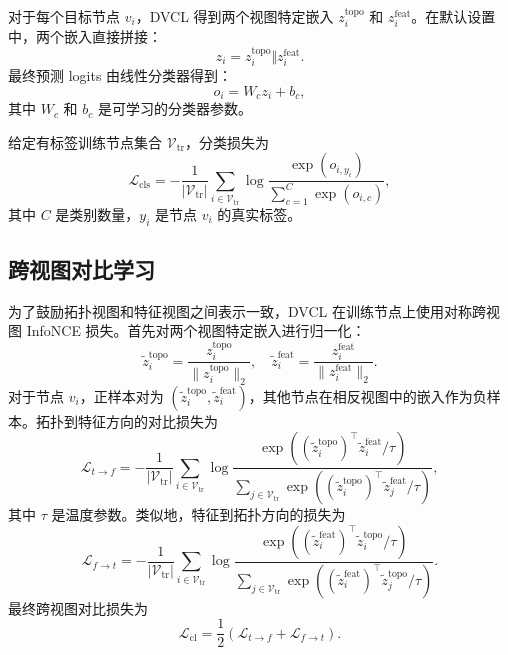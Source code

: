 对于每个目标节点 $v_i$，DVCL 得到两个视图特定嵌入 $z_i^{\mathrm{topo}}$ 和 $z_i^{\mathrm{feat}}$。在默认设置中，两个嵌入直接拼接：
\begin{equation}
z_i
=
z_i^{\mathrm{topo}}
\Vert
z_i^{\mathrm{feat}}.
\end{equation}
最终预测 logits 由线性分类器得到：
\begin{equation}
o_i
=
W_c z_i + b_c,
\end{equation}
其中 $W_c$ 和 $b_c$ 是可学习的分类器参数。

给定有标签训练节点集合 $\mathcal{V}_{\mathrm{tr}}$，分类损失为
\begin{equation}
\mathcal{L}_{\mathrm{cls}}
=
-\frac{1}{|\mathcal{V}_{\mathrm{tr}}|}
\sum_{i\in\mathcal{V}_{\mathrm{tr}}}
\log
\frac{\exp(o_{i,y_i})}
{\sum_{c=1}^{C}\exp(o_{i,c})},
\end{equation}
其中 $C$ 是类别数量，$y_i$ 是节点 $v_i$ 的真实标签。

\subsection{跨视图对比学习}

为了鼓励拓扑视图和特征视图之间表示一致，DVCL 在训练节点上使用对称跨视图 InfoNCE 损失。首先对两个视图特定嵌入进行归一化：
\begin{equation}
\tilde{z}_i^{\mathrm{topo}}
=
\frac{z_i^{\mathrm{topo}}}{\|z_i^{\mathrm{topo}}\|_2},
\quad
\tilde{z}_i^{\mathrm{feat}}
=
\frac{z_i^{\mathrm{feat}}}{\|z_i^{\mathrm{feat}}\|_2}.
\end{equation}
对于节点 $v_i$，正样本对为 $(\tilde{z}_i^{\mathrm{topo}},\tilde{z}_i^{\mathrm{feat}})$，其他节点在相反视图中的嵌入作为负样本。拓扑到特征方向的对比损失为
\begin{equation}
\mathcal{L}_{t\rightarrow f}
=
-\frac{1}{|\mathcal{V}_{\mathrm{tr}}|}
\sum_{i\in\mathcal{V}_{\mathrm{tr}}}
\log
\frac{
\exp((\tilde{z}_i^{\mathrm{topo}})^{\top}
\tilde{z}_i^{\mathrm{feat}}/\tau)
}
{
\sum_{j\in\mathcal{V}_{\mathrm{tr}}}
\exp((\tilde{z}_i^{\mathrm{topo}})^{\top}
\tilde{z}_j^{\mathrm{feat}}/\tau)
},
\end{equation}
其中 $\tau$ 是温度参数。类似地，特征到拓扑方向的损失为
\begin{equation}
\mathcal{L}_{f\rightarrow t}
=
-\frac{1}{|\mathcal{V}_{\mathrm{tr}}|}
\sum_{i\in\mathcal{V}_{\mathrm{tr}}}
\log
\frac{
\exp((\tilde{z}_i^{\mathrm{feat}})^{\top}
\tilde{z}_i^{\mathrm{topo}}/\tau)
}
{
\sum_{j\in\mathcal{V}_{\mathrm{tr}}}
\exp((\tilde{z}_i^{\mathrm{feat}})^{\top}
\tilde{z}_j^{\mathrm{topo}}/\tau)
}.
\end{equation}
最终跨视图对比损失为
\begin{equation}
\mathcal{L}_{\mathrm{cl}}
=
\frac{1}{2}
(
\mathcal{L}_{t\rightarrow f}
+
\mathcal{L}_{f\rightarrow t}
).
\end{equation}

